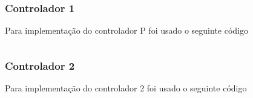 \documentclass[a4paper,11pt]{article}
\begin{document}
\newpage
\subsubsection*{Controlador 1}
Para implementação do controlador P foi usado o seguinte código
\inputminted[xleftmargin=15pt,linenos,frame=single,framesep=5pt,breaklines=true]{c++}{../arduino/pid_control_plant/pid_control_plant.ino}

\newpage
\subsubsection*{Controlador 2}
Para implementação do controlador 2 foi usado o seguinte código
\inputminted[xleftmargin=15pt,linenos,frame=single,framesep=5pt,breaklines=true]{c++}{../arduino/freq_control_plant/freq_control_plant.ino}

\end{document}
